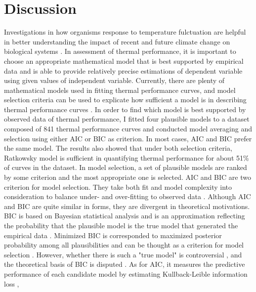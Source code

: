 \documentclass[11pt]{article}
\begin{document}
  \section{Discussion}
  Investigations in how organisms response to temperature fulctuation are helpful in better understanding 
  the impact of recent and future climate change on biological systems \cite{kingsolver2013heat, vasseur2014increased}. 
  In assessment of thermal performance, it is important to choose an appropriate mathematical model that 
  is best supported by empirical data and is able to provide relatively precise estimations of dependent variable using 
  given values of independent variable. Currently, there are plenty of mathematical models used in fitting thermal 
  performance curves, and model selection criteria can be used to explicate how sufficient a model is in describing 
  thermal performance curves \cite{krenek2011thermal, angilletta2006estimating, johnson2004model}. 
  In order to find which model is best supported by observed data of thermal performance, 
  I fitted four plausible models to a dataset composed of 841 thermal performance curves 
  and conducted model averaging and selection using either AIC or BIC as criterion. 
  In most cases, AIC and BIC prefer the same model.
  The results also showed that under both selection criteria, 
  Ratkowsky model is sufficient in quantifying thermal performance for about 51\% of curves in the dataset. 
  \newline
  In model selection, a set of plausible models are ranked by some criterion and the most appropriate one is selected. 
  AIC and BIC are two criterion for model selection. 
  They take 
  both fit and model complexity into consideration to balance under- and over-fitting to observed data 
  \cite{johnson2004model, zucchini2000introduction}. Although AIC and BIC are quite similar 
  in forms, they are divergent in theoretical motivations. BIC is based on Bayesian statistical analysis and is an 
  approximation reflecting the probability that the plausible model is the true model that generated the empirical 
  data \cite{kuha2004aic}. Minimized BIC is corresponded to maximized posterior 
  probability among all plausibilities and can be thought as a criterion for model selection \cite{wit2012all}. However, 
  whether there is such a "true model" is controversial \cite{box1979all}, and the theoretical basis of BIC is 
  disputed \cite{kuha2004aic}. As for AIC, it measures the predictive performance of 
  each candidate model by estimating Kullback-Leible information loss \cite{kuha2004aic,deleeuw1992akaike, 
   burnham2004multimodel}, 
\end{document}
